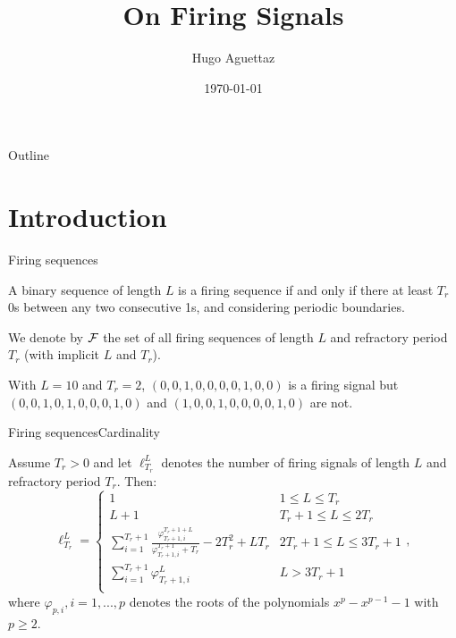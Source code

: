 \documentclass{beamer}
\title{On Firing Signals}
\author{Hugo Aguettaz}
\institute{Institut für Signal- und Informationsverarbeitung\\ETH Zürich}
\date{\today}
\begin{document}
	\begin{frame}
		\titlepage
	\end{frame} 

	\begin{frame}{Outline}
		\tableofcontents
	\end{frame}

	\section{Introduction}
	\begin{frame}
		\sectionpage
	\end{frame}

	\begin{frame}{Firing sequences}
		\justifying
		\begin{definition}
			\justifying
			A binary sequence of length $L$ is a firing sequence if and only if there at least $T_r$ 0s between any two consecutive 1s, and considering periodic boundaries.
		\end{definition}

		We denote by $\mathcal{F}$ the set of all firing sequences of length $L$ and refractory period $T_r$ (with implicit $L$ and $T_r$).

		\begin{example}
			\justifying
			With $L = 10$ and $T_r = 2$, $(0, 0, 1, 0, 0, 0, 0, 1, 0, 0)$ is a firing signal but $(0, 0, 1, 0, 1, 0, 0, 0, 1, 0)$ and $(1, 0, 0, 1, 0, 0, 0, 0, 1, 0)$ are not.
		\end{example}
	\end{frame}

	\begin{frame}{Firing sequences}{Cardinality}
		\justifying
		\begin{theorem}[Cardinality]
			\justifying
			Assume $T_r > 0$ and let $\ell_{T_r}^{L}$ denotes the number of firing signals of length $L$ and refractory period $T_r$. Then:
			\begin{equation*}
				\ell_{T_r}^{L} = 
				\begin{cases}
					1 &  1 \leq L \leq T_r \\
					L+1 & T_r + 1 \leq L \leq 2T_r \\
					\sum_{i=1}^{T_r + 1} \frac{\varphi_{T_r + 1, i}^{T_r + 1 + L}}
					{\varphi_{T_r + 1, i}^{T_r + 1} + T_r} - 2T_r^2 + L T_r 
					& 2T_r + 1 \leq L \leq 3T_r + 1 \\
					\sum_{i=1}^{T_r + 1} \varphi_{T_r + 1, i}^L
					& L > 3T_r + 1 \\
				\end{cases},
			\end{equation*}
			where $\varphi_{p, i}, i=1,...,p$ denotes the roots of the polynomials $x^p - x^{p-1} - 1$ with $p \geq 2$.
		  \end{theorem}
	\end{frame}
\end{document}
